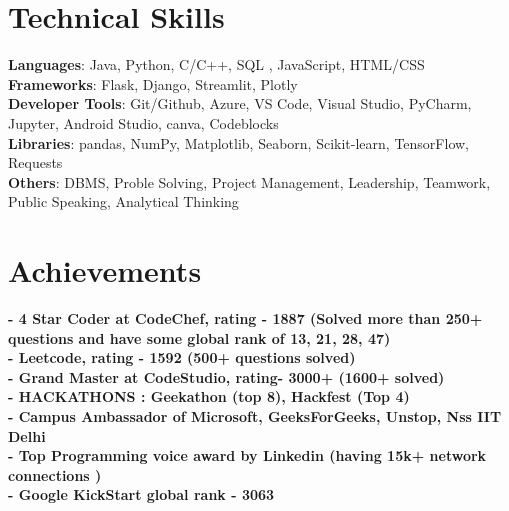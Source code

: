 \documentclass[letterpaper,11pt]{article}
\begin{document}
%
\section{Technical Skills}
 \begin{itemize}[leftmargin=0.15in, label={}]
    \small{\item{
     \textbf{Languages}{: Java, Python, C/C++, SQL , JavaScript, HTML/CSS} \\
     \textbf{Frameworks}{: Flask, Django, Streamlit, Plotly} \\
     \textbf{Developer Tools}{: Git/Github, Azure, VS Code, Visual Studio, PyCharm, Jupyter, Android Studio, canva, Codeblocks} \\
     \textbf{Libraries}{: pandas, NumPy, Matplotlib, Seaborn, Scikit-learn, TensorFlow, Requests}\\
     \textbf{Others}{: DBMS, Proble Solving, Project Management, Leadership, Teamwork, Public Speaking, Analytical Thinking}
    }}
 \end{itemize}


\section{Achievements}
 \begin{itemize}[leftmargin=0.15in, label={}]
    \small{\item{
     \textbf{- 4 Star Coder at CodeChef, rating - 1887 (Solved more than 250+ questions and have some global rank of 13, 21, 28, 47)} \\
     \textbf{- Leetcode, rating - 1592 (500+ questions solved)} \\
     \textbf{- Grand Master at CodeStudio, rating- 3000+ (1600+ solved)}\\
     \textbf{- HACKATHONS : Geekathon (top 8), Hackfest (Top 4)  }\\
     \textbf{- Campus Ambassador of Microsoft, GeeksForGeeks, Unstop, Nss IIT Delhi }\\
     \textbf{- Top Programming voice award by Linkedin (having 15k+ network connections ) }\\
     \textbf{- Google KickStart global rank - 3063}\\
     
    }}
 \end{itemize}
%
\end{document}
